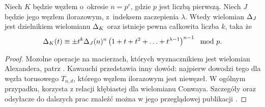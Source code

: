 \begin{proposition}
%
\label{prp:murasugi_periodic}%
    Niech $K$ będzie węzłem o~okresie $n = p^r$, gdzie $p$ jest liczbą pierwszą.
    Niech $J$ będzie jego węzłem ilorazowym, z~indeksem zaczepienia $\lambda$.
    Wtedy wielomian $\Delta_J$ jest dzielnikiem wielomianu $\Delta_K$ oraz istnieje pewna całkowita liczba $k$, taka że
    \begin{equation}
        \Delta_K(t) \equiv \pm t^k \Delta_J(n)^n \left(1 + t + t^2 + \ldots + t^{\lambda - 1}\right)^{n-1} \mod p.
    \end{equation}
\end{proposition}

\begin{proof}
    Mozolne operacje na macierzach, których wyznacznikiem jest wielomian Alexandera, patrz \cite{murasugi71}.
    Kawauchi przedstawia inny dowód: najpierw dowodzi tego dla węzła torusowego $T_{n, d}$, którego węzłem ilorazowym jest niewęzeł.
    W ogólnym przypadku, korzysta z relacji kłębiastej dla wielomianu Conwaya.
    Szczegóły oraz odsyłacze do dalszych prac znaleźć można w jego przeglądowej publikacji \cite[s. 122-124]{kawauchi96}.
\end{proof}

%


